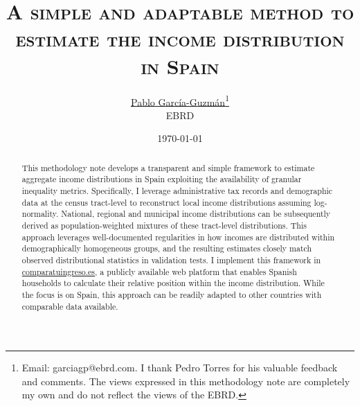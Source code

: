 \documentclass[letterpaper,11pt,leqno]{article}
\begin{document}
\title{\Large \textsc{A simple and adaptable method to estimate the income distribution in Spain}}

\author{\href{https://pablogguz.github.io/}{\large{Pablo García-Guzmán}\thanks{Email: \href{mailto:pablo.garcia-guzman@ebrd.com}{garciagp@ebrd.com}. I thank Pedro Torres for his valuable feedback and comments. The views expressed in this methodology note are completely my own and do not reflect the views of the EBRD.}} \\ \normalsize{EBRD}}

\date{\normalsize \today \\}


\maketitle
\begin{abstract}
\onehalfspacing
This methodology note develops a transparent and simple framework to estimate aggregate income distributions in Spain exploiting the availability of granular inequality metrics. Specifically, I leverage administrative tax records and demographic data at the census tract-level to reconstruct local income distributions assuming log-normality. National, regional and municipal income distributions can be subsequently derived as population-weighted mixtures of these tract-level distributions. This approach leverages well-documented regularities in how incomes are distributed within demographically homogeneous groups, and the resulting estimates closely match observed distributional statistics in validation tests. I implement this framework in \href{https://comparatuingreso.es/}{comparatuingreso.es}, a publicly available web platform that enables Spanish households to calculate their relative position within the income distribution. While the focus is on Spain, this approach can be readily adapted to other countries with comparable data available.
\end{abstract}

\thispagestyle{empty}

\newpage

\setcounter{page}{1}

\end{document}
